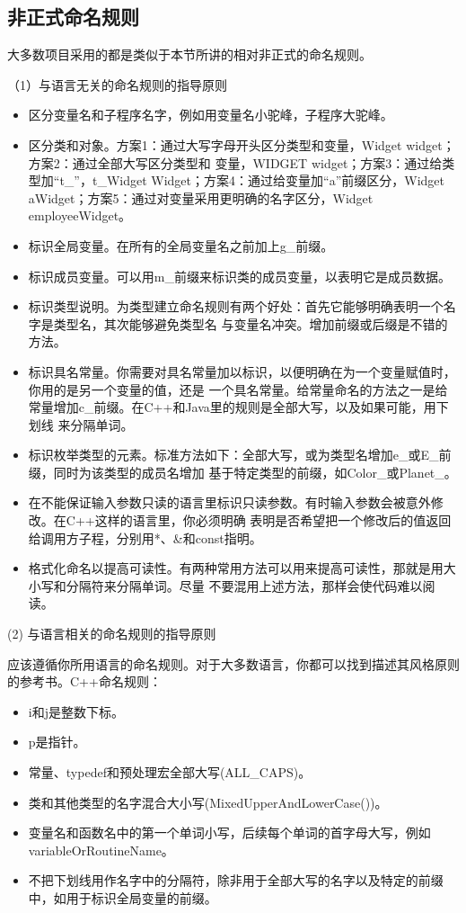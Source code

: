 \documentclass{article}
\begin{document}
\subsection{非正式命名规则}
大多数项目采用的都是类似于本节所讲的相对非正式的命名规则。
\par
（1）与语言无关的命名规则的指导原则
\par
\begin{itemize}
    \item 区分变量名和子程序名字，例如用变量名小驼峰，子程序大驼峰。
    \item 区分类和对象。方案1：通过大写字母开头区分类型和变量，Widget widget；方案2：通过全部大写区分类型和
    变量，WIDGET widget；方案3：通过给类型加“t\_”，t\_Widget Widget；方案4：通过给变量加“a”前缀区分，Widget 
    aWidget；方案5：通过对变量采用更明确的名字区分，Widget employeeWidget。
    \item 标识全局变量。在所有的全局变量名之前加上g\_前缀。
    \item 标识成员变量。可以用m\_前缀来标识类的成员变量，以表明它是成员数据。
    \item 标识类型说明。为类型建立命名规则有两个好处：首先它能够明确表明一个名字是类型名，其次能够避免类型名
    与变量名冲突。增加前缀或后缀是不错的方法。
    \item 标识具名常量。你需要对具名常量加以标识，以便明确在为一个变量赋值时，你用的是另一个变量的值，还是
    一个具名常量。给常量命名的方法之一是给常量增加c\_前缀。在C++和Java里的规则是全部大写，以及如果可能，用下划线
    来分隔单词。
    \item 标识枚举类型的元素。标准方法如下：全部大写，或为类型名增加e\_或E\_前缀，同时为该类型的成员名增加
    基于特定类型的前缀，如Color\_或Planet\_。
    \item 在不能保证输入参数只读的语言里标识只读参数。有时输入参数会被意外修改。在C++这样的语言里，你必须明确
    表明是否希望把一个修改后的值返回给调用方子程，分别用*、\&和const指明。
    \item 格式化命名以提高可读性。有两种常用方法可以用来提高可读性，那就是用大小写和分隔符来分隔单词。尽量
    不要混用上述方法，那样会使代码难以阅读。
\end{itemize}

\par
(2) 与语言相关的命名规则的指导原则
\par
应该遵循你所用语言的命名规则。对于大多数语言，你都可以找到描述其风格原则的参考书。C++命名规则：
\begin{itemize}
    \item i和j是整数下标。
    \item p是指针。
    \item 常量、typedef和预处理宏全部大写(ALL\_CAPS)。
    \item 类和其他类型的名字混合大小写(MixedUpperAndLowerCase())。
    \item 变量名和函数名中的第一个单词小写，后续每个单词的首字母大写，例如variableOrRoutineName。
    \item 不把下划线用作名字中的分隔符，除非用于全部大写的名字以及特定的前缀中，如用于标识全局变量的前缀。
\end{itemize}
\end{document}
